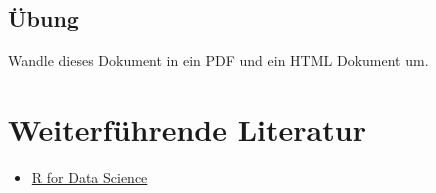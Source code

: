 \documentclass[
  letterpaper,
  DIV=11,
  numbers=noendperiod]{scrartcl}
\providecommand{\tightlist}{%
  \setlength{\itemsep}{0pt}\setlength{\parskip}{0pt}}\usepackage{longtable,booktabs,array}
\begin{document}
\subsection{Übung}\label{uxfcbung-12}

Wandle dieses Dokument in ein PDF und ein HTML Dokument um.

\section{Weiterführende Literatur}\label{weiterfuxfchrende-literatur}

\begin{itemize}
\tightlist
\item
  \href{https://r4ds.had.co.nz/}{R for Data Science}
\end{itemize}
\end{document}
